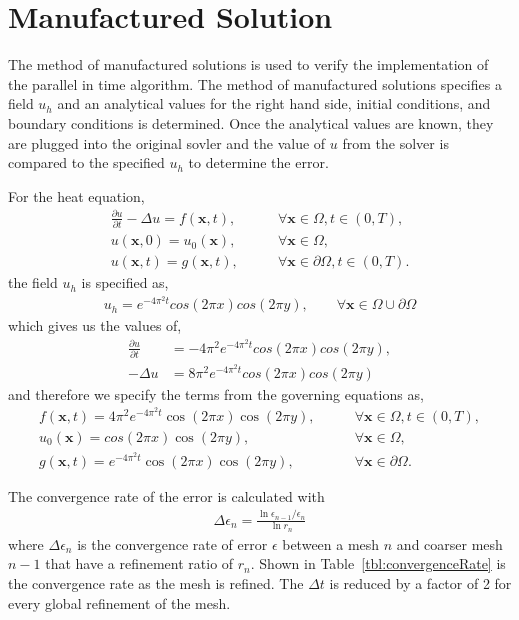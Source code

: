 \documentclass{article}
\begin{document}
\section{Manufactured Solution}
\label{sec:MFGSol}

The method of manufactured solutions is used to verify the implementation of the
parallel in time algorithm.
The method of manufactured solutions specifies a field $u_h$ and an
analytical values for the right hand side, initial conditions, and boundary
conditions is determined.
Once the analytical values are known, they are plugged into the original sovler
and the value of $u$ from the solver is compared to the specified $u_h$ to
determine the error.

For the heat equation,
\begin{align*}
  \frac{\partial u}{\partial t} - \Delta u = f(\boldsymbol{x},t), \qquad &\forall\boldsymbol{x}\in\Omega,t\in\left( 0,T \right), \\
  u(\boldsymbol{x},0) = u_0(\boldsymbol{x}), \qquad &\forall \boldsymbol{x}\in\Omega, \\
  u(\boldsymbol{x},t) = g(\boldsymbol{x},t), \qquad &\forall \boldsymbol{x}\in\partial\Omega,t\in\left( 0,T \right).
\end{align*}
the field $u_h$ is specified as,
\begin{align*}
  u_h = e^{-4\pi^2t}cos(2 \pi x)cos(2 \pi y), \qquad \forall \boldsymbol{x} \in \Omega \cup \partial\Omega
\end{align*}
which gives us the values of,
\begin{align*}
  \frac{\partial u}{\partial t} &= -4 \pi^2 e^{-4\pi^2t}cos(2 \pi x)cos(2 \pi y), \\
  -\Delta u &= 8 \pi^2 e^{-4\pi^2t}cos(2 \pi x)cos(2 \pi y)
\end{align*}
and therefore we specify the terms from the governing equations as,
\begin{align*}
  f(\boldsymbol{x},t) = 4 \pi^2 e^{-4\pi^2t}\cos(2 \pi x)\cos(2 \pi y), \qquad&\forall\boldsymbol{x}\in\Omega,t\in\left( 0,T \right), \\
  u_0(\boldsymbol{x}) = cos(2 \pi x)\cos(2 \pi y), \qquad &\forall \boldsymbol{x}\in\Omega, \\
  g(\boldsymbol{x},t) = e^{-4\pi^2t}\cos(2 \pi x)\cos(2 \pi y), \qquad &\forall \boldsymbol{x} \in \partial\Omega.
\end{align*}

The convergence rate of the error is calculated with
\begin{align*}
  \Delta \epsilon_n = \frac{\ln{\epsilon_{n-1}/\epsilon_{n}}}{\ln{r_n}}
\end{align*}
where $\Delta \epsilon_n$ is the convergence rate of error $\epsilon$ between a mesh $n$ and
coarser mesh $n-1$ that have a refinement ratio of $r_n$.
Shown in Table~\ref{tbl:convergenceRate} is the convergence rate as the mesh is
refined.
The $\Delta t$ is reduced by a factor of 2 for every global refinement of the mesh.
\end{document}

